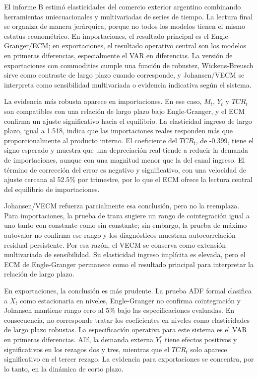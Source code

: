 \documentclass[11pt,a4paper]{article}
\begin{document}
	El informe B estimó elasticidades del comercio exterior argentino combinando
	herramientas uniecuacionales y multivariadas de series de tiempo. La lectura
	final se organiza de manera jerárquica, porque no todos los modelos tienen el
	mismo estatus econométrico. En importaciones, el resultado principal es el
	Engle-Granger/ECM; en exportaciones, el resultado operativo central son los
	modelos en primeras diferencias, especialmente el VAR en diferencias. La
	versión de exportaciones con commodities cumple una función de robustez,
	Wickens-Breusch sirve como contraste de largo plazo cuando corresponde, y
	Johansen/VECM se interpreta como sensibilidad multivariada o evidencia
	indicativa según el sistema.

	La evidencia más robusta aparece en importaciones. En ese caso, \(M_t\),
	\(Y_t\) y \(TCR_t\) son compatibles con una relación de largo plazo bajo
	Engle-Granger, y el ECM confirma un ajuste significativo hacia el equilibrio.
	La elasticidad ingreso de largo plazo, igual a 1.518, indica que las
	importaciones reales responden más que proporcionalmente al producto interno.
	El coeficiente del \(TCR_t\), de -0.399, tiene el signo esperado y muestra que
	una depreciación real tiende a reducir la demanda de importaciones, aunque con
	una magnitud menor que la del canal ingreso. El término de corrección del error
	es negativo y significativo, con una velocidad de ajuste cercana al 52.5\% por
	trimestre, por lo que el ECM ofrece la lectura central del equilibrio de
	importaciones.

	Johansen/VECM refuerza parcialmente esa conclusión, pero no la reemplaza. Para
	importaciones, la prueba de traza sugiere un rango de cointegración igual a uno
	tanto con constante como sin constante; sin embargo, la prueba de máximo
	autovalor no confirma ese rango y los diagnósticos muestran autocorrelación
	residual persistente. Por esa razón, el VECM se conserva como extensión
	multivariada de sensibilidad. Su elasticidad ingreso implícita es elevada, pero
	el ECM de Engle-Granger permanece como el resultado principal para interpretar
	la relación de largo plazo.

	En exportaciones, la conclusión es más prudente. La prueba ADF formal clasifica
	a \(X_t\) como estacionaria en niveles, Engle-Granger no confirma cointegración
	y Johansen mantiene rango cero al 5\% bajo las especificaciones evaluadas. En
	consecuencia, no corresponde tratar los coeficientes en niveles como
	elasticidades de largo plazo robustas. La especificación operativa para este
	sistema es el VAR en primeras diferencias. Allí, la demanda externa \(Y_t^*\)
	tiene efectos positivos y significativos en los rezagos dos y tres, mientras
	que el \(TCR_t\) solo aparece significativo en el tercer rezago. La evidencia
	para exportaciones se concentra, por lo tanto, en la dinámica de corto plazo.
\end{document}

